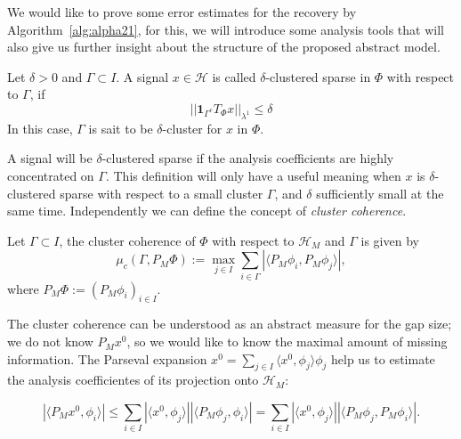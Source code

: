 \bigskip

We would like to prove some error estimates for the recovery by Algorithm~\ref{alg:alpha21}, for this, we will introduce some analysis tools that will also give us further insight about the structure of the proposed abstract model.

\bigskip

\begin{defn}
\label{def:alpha22}
Let $\delta>0$ and $\Gamma\subset I$. A signal $x\in\mathcal{H}$ is called $\delta$-clustered sparse in $\Phi$ with respect to $\Gamma$, if
\begin{equation}
\label{eq:alpha22}
||\mathbf{1}_{\Gamma^c}T_{\Phi}x||_{\lambda^1}\leq \delta
\end{equation}
In this case, $\Gamma$ is sait to be $\delta$-cluster for $x$ in $\Phi$. 
\end{defn}

\bigskip

A signal will be $\delta$-clustered sparse if the analysis coefficients are highly concentrated on $\Gamma$. This definition will only have a useful meaning when $x$ is $\delta$-clustered sparse with respect to a small cluster $\Gamma$, and $\delta$ sufficiently small at the same time. Independently we can define the concept of \textit{cluster coherence}.

\bigskip

\begin{defn}
Let $\Gamma\subset I$, the cluster coherence of $\Phi$ with respect to $\mathcal{H}_M$ and $\Gamma$ is given by 
$$
\mu_c(\Gamma,P_M\Phi):=\max_{j\in I}\sum_{i\in\Gamma}|\langle P_M\phi_i,P_M\phi_j\rangle|,
$$
where $P_M\Phi:=(P_M\phi_i)_{i\in I}$.
\end{defn}

\bigskip

The cluster coherence can be understood as an abstract measure for the gap size; we do not know $P_Mx^0$, so we would like to know the maximal amount of missing information. The Parseval expansion $x^0=\sum_{j\in I}\langle x^0,\phi_j\rangle \phi_j$ help us to estimate the analysis coefficientes of its projection onto $\mathcal{H}_M$:

\begin{equation}
\label{eq:alpha23}
|\langle P_Mx^0,\phi_i\rangle|\leq\sum_{i\in I}|\langle x^0,\phi_j\rangle||\langle P_M\phi_j,\phi_i\rangle|=\sum_{i\in I}|\langle x^0,\phi_j\rangle||\langle P_M\phi_j, P_M\phi_i\rangle|.
\end{equation}

